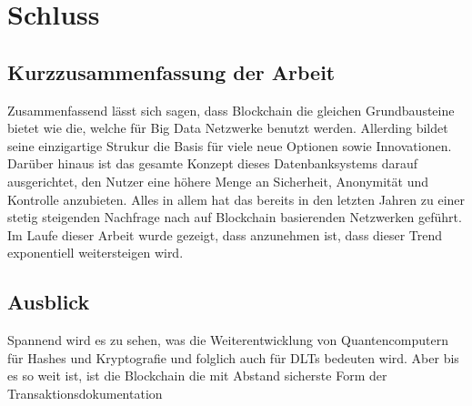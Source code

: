 \chapter{Schluss}


\section{Kurzzusammenfassung der Arbeit}
Zusammenfassend lässt sich sagen, dass Blockchain die gleichen Grundbausteine bietet wie die, welche für Big Data Netzwerke benutzt werden.
Allerding bildet seine einzigartige Strukur die Basis für viele neue Optionen sowie Innovationen.
Darüber hinaus ist das gesamte Konzept dieses Datenbanksystems darauf ausgerichtet, den Nutzer eine höhere Menge an Sicherheit, Anonymität und Kontrolle anzubieten.
Alles in allem hat das bereits in den letzten Jahren zu einer stetig steigenden Nachfrage nach auf Blockchain basierenden Netzwerken geführt.
Im Laufe dieser Arbeit wurde gezeigt, dass anzunehmen ist, dass dieser Trend exponentiell weitersteigen wird.

\section{Ausblick}
Spannend wird es zu sehen, was die Weiterentwicklung von Quantencomputern für Hashes und Kryptografie und folglich auch für DLTs bedeuten wird. Aber bis es so weit ist, ist die Blockchain die mit Abstand sicherste Form der Transaktionsdokumentation